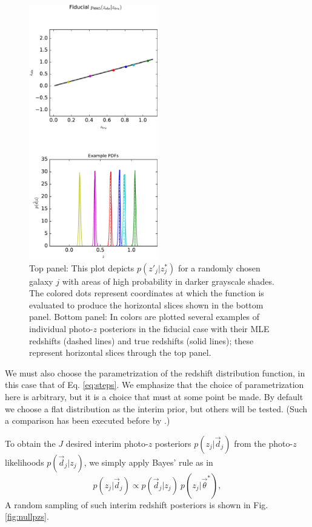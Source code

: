 \documentclass[preprint]{aastex}
\begin{document}
\begin{figure}
\includegraphics[width=0.5\textwidth]{figs/sig2/zobsvztru.pdf}
\caption{Top panel: This plot depicts $p(z'_{j}|z^{*}_{j})$ for a randomly 
chosen galaxy $j$ with areas of high probability in darker grayscale shades.  
The colored dots represent coordinates at which the function is evaluated to 
produce the horizontal slices shown in the bottom panel.  Bottom panel: In 
colors are plotted several examples of individual photo-$z$ posteriors in the 
fiducial case with their MLE redshifts (dashed lines) and true redshifts (solid 
lines); these represent horizontal slices through the top panel.}
\label{fig:nullpzsgen}
\end{figure}

We must also choose the parametrization of the redshift distribution function, 
in this case that of Eq. \ref{eq:steps}.   We emphasize that the choice of 
parametrization here is arbitrary, but it is a choice that must at some point 
be made.  By default we choose a flat distribution as the interim prior, but 
others will be tested.  (Such a comparison has been executed before by 
\citet{Viironen2015}.)

To obtain the $J$ desired interim photo-$z$ posteriors $p(z_{j}|\vec{d}_{j})$ 
from the photo-$z$ likelihoods $p(\vec{d}_{j}|z_{j})$, we simply apply Bayes' 
rule as in 
\begin{equation}
\label{eq:likpost}
p(z_{j}|\vec{d}_{j}) \propto p(\vec{d}_{j}|z_{j})\ p(z_{j}|\vec{\theta}^{*}),
\end{equation}
A random sampling of such interim redshift posteriors is shown in Fig. 
\ref{fig:nullpzs}.  
\end{document}
